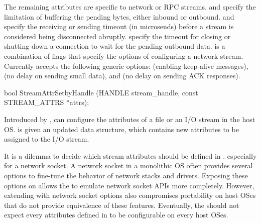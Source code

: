 The remaining attributes are specific to network or RPC streams.
 and  specify the limitation of buffering the pending bytes, either inbound or outbound.
 and  specify the receiving or sending timeout (in microsends)
before a stream is considered being disconnected abruptly.
 specify the timeout for closing or shutting down a connection
to wait for the pending outbound data.
 is a combination of flags that specify the options of configuring a network stream.
Currently  accepts the following generic options:
 (enabling keep-alive messages), %
 (no delay on sending small data),
and  (no delay on sending ACK responses).


\begin{paldef}
bool StreamAttrSetbyHandle (HANDLE stream_handle,
                            const STREAM_ATTRS *attrs);
\end{paldef}


Introduced by \graphene{},
 can configure
the attributes of a file or an I/O stream
in the host OS.
 is given an updated  data structure,
which contains new attributes to be assigned
to the I/O stream.


It is a dilemma 
to decide which stream attributes
should be defined in .
especially for a network socket.
A network socket in a monolithic OS often provides several options to fine-tune the behavior of network stacks and drivers.
Exposing these options on \thehostabi{} allows the \libos{} to emulate network socket APIs more completely.
However, extending \thehostabi{} with network socket options also compromises portability
on host OSes that do not provide equivalence of these features.
Eventually, the \libos{} should not expect every attributes defined in  to be configurable on every host OSes.





